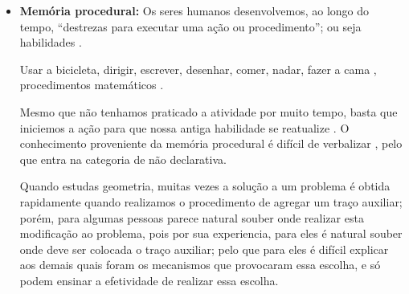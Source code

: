 \begin{itemize}
\item \textbf{Memória procedural:}
\label{reflab:memprocedural}
Os seres humanos desenvolvemos, ao longo do tempo, ``destrezas para executar uma ação ou procedimento'';
ou seja habilidades
\cite[pp. 140]{pake2019psicologia} \cite[pp. 36]{de2000comprension}.
\begin{example}
Usar a bicicleta, dirigir, escrever, desenhar, comer, nadar, fazer a cama \cite[pp. 36]{de2000comprension},
procedimentos matemáticos \cite{evans2016extension} \cite{davis2000memory}.
\end{example}
Mesmo que não tenhamos praticado a atividade por muito tempo, 
basta que iniciemos a ação para que nossa antiga habilidade se reatualize 
\cite[pp. 36]{de2000comprension}.
O conhecimento proveniente da memória procedural é difícil de verbalizar
\cite[pp. 36]{de2000comprension}, pelo que entra na categoria de não declarativa.
\begin{example}
Quando estudas geometria, 
muitas vezes a solução a um problema é obtida rapidamente quando realizamos o procedimento de agregar um traço auxiliar;
porém, para algumas pessoas parece natural souber onde realizar esta modificação ao problema,
pois por sua experiencia, para eles é natural souber onde deve ser colocada o traço auxiliar;
pelo que para eles é difícil explicar aos demais quais foram os mecanismos que provocaram essa escolha,
e só podem ensinar a efetividade de realizar essa escolha.


\end{example}
\end{itemize}
